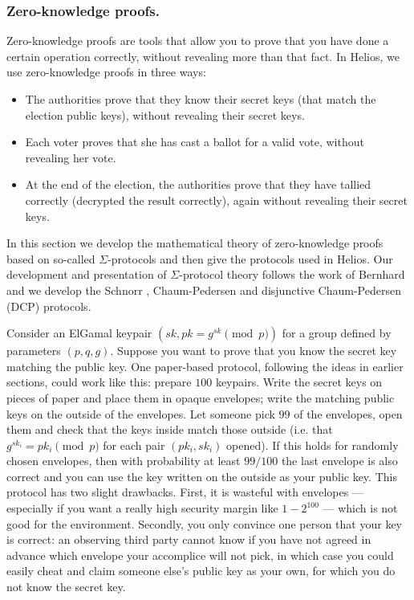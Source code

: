 \documentclass{llncs}
\begin{document}
\subsubsection{Zero-knowledge proofs.}
Zero-knowledge proofs are tools that allow you to prove that you have done a
certain operation correctly, without revealing more than that fact.
In Helios, we use zero-knowledge proofs in three ways:
\begin{itemize}
\item The authorities prove that they know their secret keys (that match the
election public keys), without revealing their secret keys.
\item Each voter proves that she has cast a ballot for a valid vote, without
revealing her vote.
\item At the end of the election, the authorities prove that they have tallied
correctly (decrypted the result correctly), again without revealing their secret
keys.
\end{itemize}
In this section we develop the mathematical theory of zero-knowledge proofs
based on so-called $\Sigma$-protocols and then give the protocols used in
Helios. Our development and presentation of $\Sigma$-protocol theory follows the
work of Bernhard \cite{B14} and we develop the Schnorr \cite{S91},
Chaum-Pedersen \cite{CP92} and disjunctive Chaum-Pedersen (DCP) protocols.

Consider an ElGamal keypair $(sk, pk = g^{sk} \pmod{p})$ for a group defined by
parameters $(p, q, g)$. Suppose you want to prove that you know the secret key
matching the public key. One paper-based protocol, following the ideas in
earlier sections, could work like this: prepare $100$ keypairs. Write the secret
keys on pieces of paper and place them in opaque envelopes; write the matching
public keys on the outside of the envelopes. Let someone pick $99$ of the
envelopes, open them and check that the keys inside match those outside (i.e.
that $g^{sk_i} = pk_i \pmod{p}$ for each pair $(pk_i, sk_i)$ opened). If this
holds for randomly chosen envelopes, then with probability at least $99/100$ the
last envelope is also correct and you can use the key written on the outside as
your public key. This protocol has two slight drawbacks. First, it is wasteful
with envelopes --- especially if you want a really high security margin like
$1 - 2^{100}$ --- which is not good for the environment. Secondly, you only
convince one person that your key is correct: an observing third party cannot
know if you have not agreed in advance which envelope your accomplice will not
pick, in which case you could easily cheat and claim someone else's public key
as your own, for which you do not know the secret key.
\end{document}
